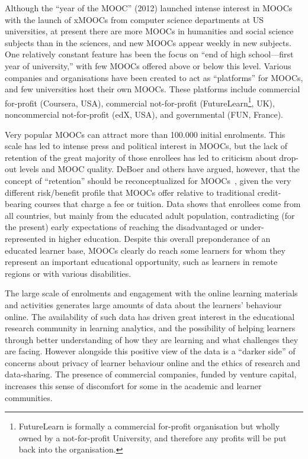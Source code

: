 Although the ``year of the MOOC'' (2012) launched intense interest in
MOOCs with the launch of xMOOCs from computer science
departments at US universities, at present there are more MOOCs in
humanities and social 
science subjects than in the sciences, and new MOOCs appear weekly in new
subjects.  One relatively constant feature has been the focus on ``end of
high school---first year of university,'' with few MOOCs offered above or
below this level.  Various companies and organisations have been created
to act as   ``platforms'' for MOOCs, and few universities host their own
MOOCs. These platforms include commercial for-profit (Coursera, USA),
commercial not-for-profit (FutureLearn\footnote{FutureLearn is formally a commercial 
for-profit organisation but wholly owned by a not-for-profit University, and therefore 
any profits will be put back into the organisation.}, UK), noncommercial
not-for-profit (edX, USA), and governmental (FUN, France).

Very popular MOOCs can attract
more than 100.000 initial enrolments.  This scale has led to intense press
and political interest in MOOCs, but the lack of retention of the great
majority of those enrollees has led to
criticism about drop-out levels and MOOC quality.  
DeBoer and others have argued, however, that the concept of ``retention''
should be reconceptualized for MOOCs~\cite{deboer-ho-reconceptualizing},
given the very different 
risk/benefit profile that MOOCs offer relative to traditional
credit-bearing courses
that charge a fee or tuition.
Data shows that enrollees come from all countries, but mainly from the
educated adult population, contradicting (for the present) early
expectations of reaching the disadvantaged or under-represented in
higher education.  Despite this overall preponderance of an educated
learner base, MOOCs clearly do reach some learners for whom they
represent an important educational opportunity, such as learners in
remote regions or
with various disabilities.

The large scale of enrolments and engagement with the online learning
materials and activities generates large amounts of data about the
learners' behaviour online.  The availability of such data has driven
great interest in the educational research community in learning
analytics, and the possibility of helping learners through better
understanding of how they are learning and what challenges they are
facing.  However alongside this positive view of the data is a ``darker
side'' of concerns about privacy of learner behaviour online and the
ethics of research and data-sharing.  The presence of commercial
companies, funded by venture capital, increases this sense of discomfort
for some in the academic and learner communities.

